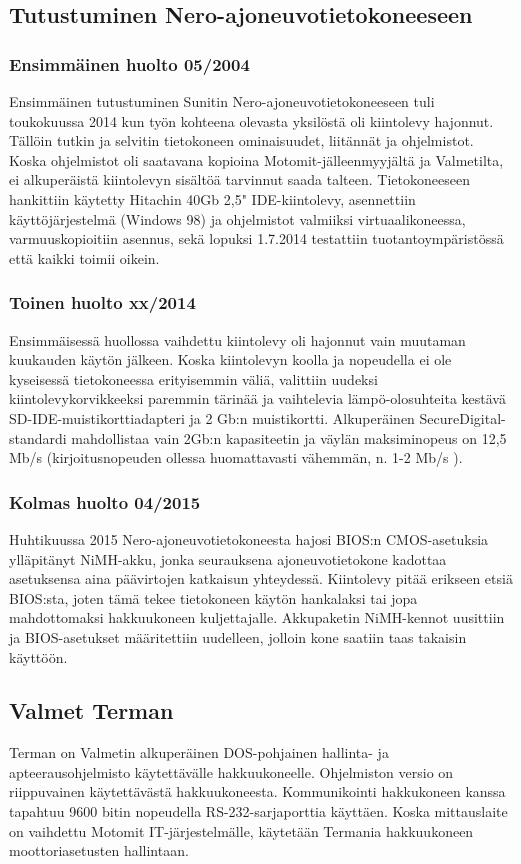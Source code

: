 \documentclass[11pt,a4paper,oneside,article]{memoir}
\begin{document}
\subsection{Tutustuminen Nero-ajoneuvotietokoneeseen}
\subsubsection{Ensimmäinen huolto 05/2004}
Ensimmäinen tutustuminen Sunitin Nero-ajoneuvotietokoneeseen tuli toukokuussa 2014 kun työn kohteena olevasta yksilöstä oli kiintolevy hajonnut. Tällöin tutkin ja selvitin tietokoneen ominaisuudet, liitännät ja ohjelmistot. Koska ohjelmistot oli saatavana kopioina Motomit-jälleenmyyjältä ja Valmetilta, ei alkuperäistä kiintolevyn sisältöä tarvinnut saada talteen. Tietokoneeseen hankittiin käytetty Hitachin 40Gb 2,5" IDE-kiintolevy, asennettiin käyttöjärjestelmä (Windows 98) ja ohjelmistot valmiiksi virtuaalikoneessa, varmuuskopioitiin asennus, sekä lopuksi 1.7.2014 testattiin tuotantoympäristössä että kaikki toimii oikein.

\subsubsection{Toinen huolto xx/2014}
Ensimmäisessä huollossa vaihdettu kiintolevy oli hajonnut vain muutaman kuukauden käytön jälkeen. Koska kiintolevyn koolla ja nopeudella ei ole kyseisessä tietokoneessa erityisemmin väliä, valittiin uudeksi kiintolevykorvikkeeksi paremmin tärinää ja vaihtelevia lämpö-olosuhteita kestävä SD-IDE-muistikorttiadapteri ja 2 Gb:n muistikortti. Alkuperäinen SecureDigital-standardi mahdollistaa vain 2Gb:n kapasiteetin ja väylän maksiminopeus on 12,5 Mb/s (kirjoitusnopeuden ollessa huomattavasti vähemmän, n. 1-2 Mb/s )\cite{sd:2gb}.

\subsubsection{Kolmas huolto 04/2015}
Huhtikuussa 2015 Nero-ajoneuvotietokoneesta hajosi BIOS:n CMOS-asetuksia ylläpitänyt NiMH-akku, jonka seurauksena ajoneuvotietokone kadottaa asetuksensa aina päävirtojen katkaisun yhteydessä. Kiintolevy pitää erikseen etsiä BIOS:sta, joten tämä tekee tietokoneen käytön hankalaksi tai jopa mahdottomaksi hakkuukoneen kuljettajalle. Akkupaketin NiMH-kennot uusittiin ja BIOS-asetukset määritettiin uudelleen, jolloin kone saatiin taas takaisin käyttöön.

\subsection{Valmet Terman}
Terman on Valmetin alkuperäinen DOS-pohjainen hallinta- ja apteerausohjelmisto käytettävälle hakkuukoneelle. Ohjelmiston versio on riippuvainen käytettävästä hakkuukoneesta. Kommunikointi hakkukoneen kanssa tapahtuu 9600 bitin nopeudella RS-232-sarjaporttia käyttäen. Koska mittauslaite on vaihdettu Motomit IT-järjestelmälle, käytetään Termania hakkuukoneen moottoriasetusten hallintaan.
\end{document}
